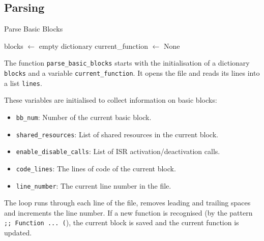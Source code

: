 \documentclass[
fancyheadings, %
%
%
]{stsreprt}
\begin{document}
{\subsection*{Parsing}
\begin{algorithm}[H]
	\caption{Parse Basic Blocks}
	\DontPrintSemicolon
	\SetAlgoLined
	blocks $\gets$ empty dictionary\;
	current\_function $\gets$ None\;
	\BlankLine
\end{algorithm}

The function \texttt{parse\_basic\_blocks} starts with the initialisation of a dictionary \texttt{blocks} and a variable \texttt{current\_function}. It opens the file and reads its lines into a list \texttt{lines}.

These variables are initialised to collect information on basic blocks: 
\begin{itemize}
	\item \texttt{bb\_num}: Number of the current basic block.
	\item \texttt{shared\_resources}: List of shared resources in the current block.
	\item \texttt{enable\_disable\_calls}: List of ISR activation/deactivation calls.
	\item \texttt{code\_lines}: The lines of code of the current block.
	\item \texttt{line\_number}: The current line number in the file.
\end{itemize}


The loop runs through each line of the file, removes leading and trailing spaces and increments the line number. If a new function is recognised (by the pattern \texttt{;; Function ... (}), the current block is saved and the current function is updated.

}
\end{document}
